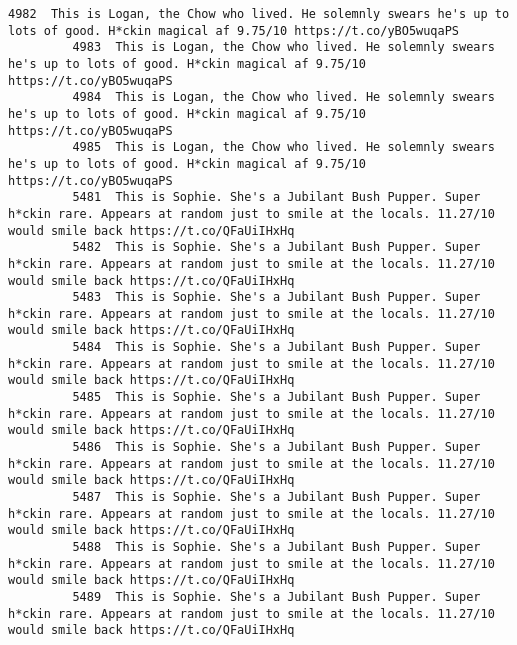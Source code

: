 \documentclass[11pt]{article}
\begin{document}
\begin{Verbatim}[commandchars=\\\{\}]
         4982  This is Logan, the Chow who lived. He solemnly swears he's up to lots of good. H*ckin magical af 9.75/10 https://t.co/yBO5wuqaPS                                    
         4983  This is Logan, the Chow who lived. He solemnly swears he's up to lots of good. H*ckin magical af 9.75/10 https://t.co/yBO5wuqaPS                                    
         4984  This is Logan, the Chow who lived. He solemnly swears he's up to lots of good. H*ckin magical af 9.75/10 https://t.co/yBO5wuqaPS                                    
         4985  This is Logan, the Chow who lived. He solemnly swears he's up to lots of good. H*ckin magical af 9.75/10 https://t.co/yBO5wuqaPS                                    
         5481  This is Sophie. She's a Jubilant Bush Pupper. Super h*ckin rare. Appears at random just to smile at the locals. 11.27/10 would smile back https://t.co/QFaUiIHxHq   
         5482  This is Sophie. She's a Jubilant Bush Pupper. Super h*ckin rare. Appears at random just to smile at the locals. 11.27/10 would smile back https://t.co/QFaUiIHxHq   
         5483  This is Sophie. She's a Jubilant Bush Pupper. Super h*ckin rare. Appears at random just to smile at the locals. 11.27/10 would smile back https://t.co/QFaUiIHxHq   
         5484  This is Sophie. She's a Jubilant Bush Pupper. Super h*ckin rare. Appears at random just to smile at the locals. 11.27/10 would smile back https://t.co/QFaUiIHxHq   
         5485  This is Sophie. She's a Jubilant Bush Pupper. Super h*ckin rare. Appears at random just to smile at the locals. 11.27/10 would smile back https://t.co/QFaUiIHxHq   
         5486  This is Sophie. She's a Jubilant Bush Pupper. Super h*ckin rare. Appears at random just to smile at the locals. 11.27/10 would smile back https://t.co/QFaUiIHxHq   
         5487  This is Sophie. She's a Jubilant Bush Pupper. Super h*ckin rare. Appears at random just to smile at the locals. 11.27/10 would smile back https://t.co/QFaUiIHxHq   
         5488  This is Sophie. She's a Jubilant Bush Pupper. Super h*ckin rare. Appears at random just to smile at the locals. 11.27/10 would smile back https://t.co/QFaUiIHxHq   
         5489  This is Sophie. She's a Jubilant Bush Pupper. Super h*ckin rare. Appears at random just to smile at the locals. 11.27/10 would smile back https://t.co/QFaUiIHxHq   
         

\end{Verbatim}
\end{document}
